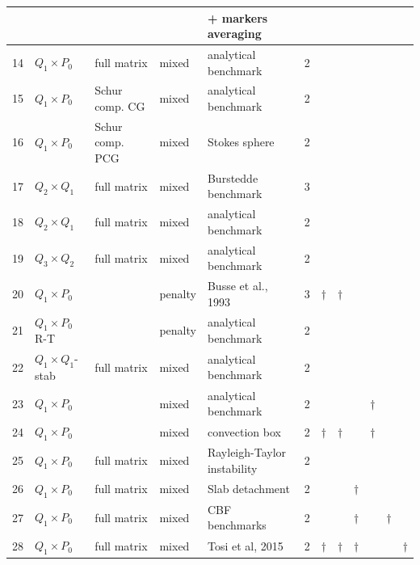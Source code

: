 \documentclass[a4paper]{article}
\begin{document}
{\begin{tabular}{|p{0.4cm}||p{1.9cm}p{2.6cm}p{1.5cm}p{4.1cm}|p{0.2cm}|p{0.2cm}|p{0.2cm}|p{0.2cm}|p{0.2cm}|p{0.2cm}|p{0.2cm}|}
   &                  &              &         & + markers averaging         &   &       &        & &&\\
\hline
14 & $Q_1 \times P_0$ & full matrix & mixed   & analytical benchmark        & 2 &       &        & & &\\ 
\hline
15 & $Q_1 \times P_0$ & Schur comp. CG & mixed   & analytical benchmark        & 2 &       &        & &&\\ 
\hline
16 & $Q_1 \times P_0$ & Schur comp. PCG & mixed   & Stokes sphere               & 2 &       &        & &&\\ 
\hline
17 & $Q_2 \times Q_1$ & full matrix & mixed   & Burstedde benchmark         & 3 &       &        & &&\\ 
\hline
18 & $Q_2 \times Q_1$ & full matrix & mixed   & analytical benchmark        & 2 &       &        & &&\\ 
\hline
19 & $Q_3 \times Q_2$ & full matrix & mixed   & analytical benchmark        & 2 &       &        & &&\\ 
\hline
20 & $Q_1 \times P_0$ &              & penalty & Busse et al., 1993            & 3 & $\dag$& $\dag$ & & &\\ 
\hline
21 & $Q_1 \times P_0$ R-T  &              & penalty & analytical benchmark        & 2 &       &        & &&\\ 
\hline
22 & $Q_1 \times Q_1$-stab & full matrix  & mixed & analytical benchmark    & 2 &       &        & &&\\ 
\hline
23 & $Q_1 \times P_0$ &              & mixed  & analytical benchmark         & 2 &       &        & & $\dag$ &\\ 
\hline
24 & $Q_1 \times P_0$ &              & mixed  & convection box               & 2 & $\dag$& $\dag$ & & $\dag$ &\\
\hline
25 & $Q_1 \times P_0$ & full matrix & mixed  & Rayleigh-Taylor instability  & 2 &       &        & & &\\ 
\hline
26 & $Q_1 \times P_0$ & full matrix & mixed  & Slab detachment              & 2 &       &        & $\dag$ & &\\ 
\hline
27 & $Q_1 \times P_0$ & full matrix & mixed  & CBF benchmarks               & 2 &       &        & $\dag$ &  & $\dag$\\ 
\hline
28 & $Q_1 \times P_0$ & full matrix & mixed  & Tosi et al, 2015             & 2 &  $\dag$     &  $\dag$  & $\dag$ & & &$\dag$\\ 
\hline
\hline
\end{tabular}
}
\end{document}
